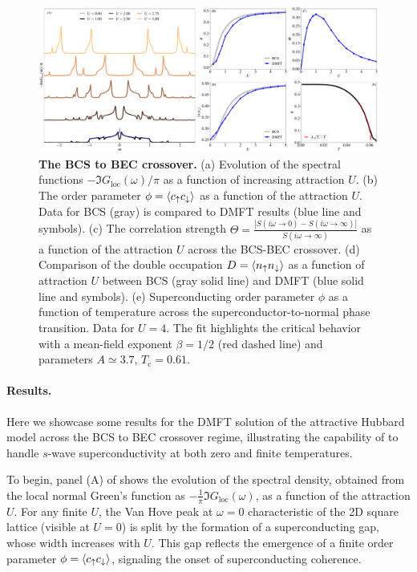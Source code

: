 \documentclass[edipack_sp.tex]{subfiles}
\begin{document}
\begin{figure}[t!]
  \includegraphics[width=\linewidth]{figures/figAHM.pdf}
    \caption{\label{figEx2}%
      \textbf{The BCS to BEC crossover.}
      (a) Evolution of the spectral functions
      $-\Im{G_\mathrm{loc}(\omega)}/\pi$ as a function of increasing
      attraction $U$. 
      (b) The order parameter $\phi=\langle c_\uparrow c_\downarrow\rangle$ as a
      function of the attraction $U$. Data for BCS (gray) is compared
      to DMFT results (blue line and symbols). 
      (c) The correlation strength
      $\Theta=\frac{|S(i\omega\to0)-S(i\omega\to\infty)|}{S(i\omega\to\infty)}$ as a function of the
      attraction $U$ across the BCS-BEC crossover. 
      (d) Comparison of the double occupation $D=\langle n_\uparrow
      n_\downarrow\rangle$ as a function of attraction $U$ between BCS (gray
      solid line) and DMFT (blue solid line and symbols). 
      (e) Superconducting order
      parameter $\phi$ as a function of temperature across the
      superconductor-to-normal phase transition. Data for $U=4$. The
      fit highlights the critical behavior with a mean-field exponent
      $\beta=1/2$ (red dashed line) and parameters $A\simeq 3.7$, $T_\mathrm{c}=0.61$.       
        }
\end{figure}

\paragraph{Results.}
Here we showcase some results for the DMFT solution of the 
attractive Hubbard model across the BCS to BEC crossover regime, 
illustrating the capability of \NAME to handle $s$-wave 
superconductivity at both zero and finite temperatures.

To begin, panel (A) of  shows the evolution of the 
spectral density, obtained from the local normal Green's function as 
$-\tfrac{1}{\pi}\Im G_\mathrm{loc}(\omega)$, as a function of the 
attraction $U$. For any finite $U$, the Van Hove peak at 
$\omega = 0$ characteristic of the 2D square lattice (visible at 
$U = 0$) is split by the formation of a superconducting gap, whose 
width increases with $U$. This gap reflects the emergence of a finite 
order parameter $\phi = \langle c_\uparrow c_\downarrow \rangle$, signaling the 
onset of superconducting coherence.
\end{document}
